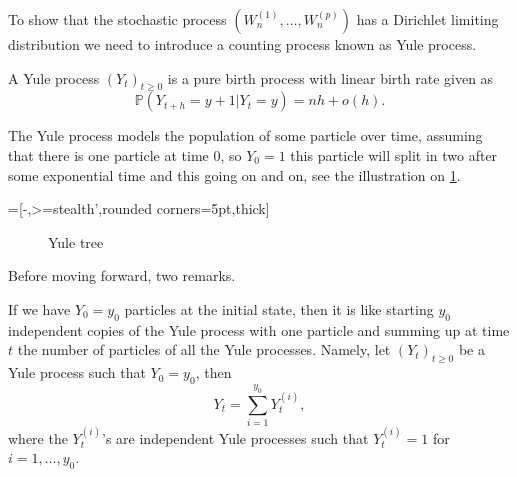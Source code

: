 To show that the stochastic process $(W_n^{(1)},\ldots, W_n^{(p)})$ has a Dirichlet limiting distribution we need to introduce a counting process known as Yule process.
\begin{definition}\label{def:yule_process}
A Yule process $(Y_t)_{t\geq0}$ is a pure birth process with linear birth rate given as 
\[
\mathbb{P}(Y_{t+h} = y+1|Y_{t} =y) = nh+o(h).
\] 
\end{definition}
The Yule process models the population of some particle over time, assuming that there is one particle at time $0$, so $Y_0=1$ this particle will split in two after some exponential time and this going on and on, see the illustration on \cref{fig:yule_tree}. 

=[-,>=stealth',rounded corners=5pt,thick]  
\begin{figure}[!ht]
\begin{center}
\caption{Yule tree}
\label{fig:yule_tree}
\end{center}
\end{figure}
Before moving forward, two remarks.
\begin{remark}\label{rem:yule_process_initial}
If we have $Y_0 = y_0$ particles at the initial state, then it is like starting $y_0$ independent copies of the Yule process with one particle and summing up at time $t$ the number of particles of all the Yule processes. Namely, let $(Y_t)_{t\geq0}$ be a Yule process such that $Y_0 = y_0$, then
$$
Y_t = \sum_{i = 1}^{y_0}Y_t^{(i)},
$$   
where the $Y_t^{(i)}$'s are independent Yule processes such that $Y_t^{(i)}=1$ for $i = 1,\ldots, y_0$.
\end{remark}
